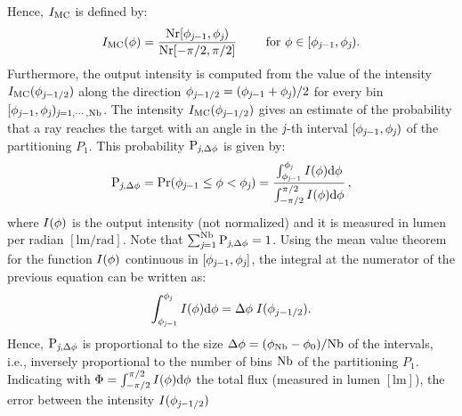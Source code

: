 Hence, $I_{\textrm{MC}}$ is defined by:
\begin{equation} \label{g_mc}
I_{\textrm{MC}}(\phi) = \frac{\textrm{Nr}[\phi_{\textit{j}-1},\phi_{\textit{j}})}{\textrm{Nr}[-\pi/2, \pi/2]} \qquad \mbox{ for } \phi\in[\phi_{\textit{j}-1}, \phi_{\textit{j}}).
\end{equation}
Furthermore, the output intensity is computed from the value of the intensity $I_{\textrm{MC}}(\phi_{\textit{j}-1/2})$ along the direction $\phi_{\textit{j}-1/2}=(\phi_{\textit{j}-1}+
\phi_{\textit{j}})/2$ for every bin $[\phi_{\textit{j}-1},\phi_{\textit{j}})_{\textit{j} = 1, \cdots, \textrm{Nb}}$.
 The intensity $I_{\textrm{MC}}(\phi_{\textit{j}-1/2})$ gives an estimate of the probability that a ray reaches the target with an angle in the $\textit{j}$-th interval 
$[\phi_{\textit{j}-1}, \phi_{\textit{j}})$ of the partitioning $P_1$. This probability $\textrm{P}_{\textit{j}, \Delta\phi}$ is given by:
\begin{equation}\label{eq:probability}
\textrm{P}_{\textit{j}, \Delta\phi} = \Pr(\phi_{\textit{j}-1}\leq\phi<\phi_{\textit{j}})= 
\frac{\int_{\phi_{\textit{j}-1}}^{\phi_{\textit{j}}} I(\phi) \textrm{d}\phi}{\int_{-\pi/2}^{\pi/2}I(\phi) \textrm{d}\phi}\,,
\end{equation}
where $I(\phi)$ is the output intensity (not normalized) and it is measured in lumen per radian $[\textrm{lm}/\textrm{rad}]$.
Note that $\sum_{\textit{j}=1}^{\textrm{Nb}}\textrm{P}_{\textit{j}, \Delta\phi}=1$. Using the mean value theorem for the function 
$I(\phi)$ continuous in $[\phi_{\textit{j}-1}, \phi_{\textit{j}}]$, the integral at the numerator of the previous equation can be written as: \begin{equation}
\int_{\phi_{\textit{j}-1}}^{\phi_{\textit{j}}} I(\phi) \textrm{d}\phi = \Delta \phi\;I(\phi_{j-1/2}).
\end{equation}
Hence, $\textrm{P}_{\textit{j}, \Delta\phi}$ is proportional to the size $\Delta\phi= (\phi_{\textrm{Nb}}-\phi_{0})/{\textrm{Nb}}$ 
of the intervals, i.e., inversely proportional to the number of bins $\textrm{Nb}$ of the partitioning $P_1$.
Indicating with $\Phi = \int_{-\pi/2}^{\pi/2}I(\phi) \textrm{d}\phi$ the total flux (measured in lumen $[\textrm{lm}]$),
the error between the intensity $I(\phi_{\textit{j}-1/2})$
